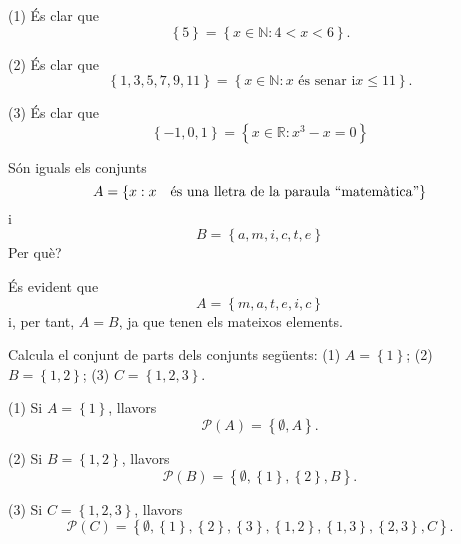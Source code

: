 \begin{solucio}
(1) \'{E}s clar que%
\begin{equation*}
\left\{ 5\right\} =\left\{ x\in \mathbb{N}:4<x<6\right\} \text{.}
\end{equation*}

(2) \'{E}s clar que%
\begin{equation*}
\left\{ 1,3,5,7,9,11\right\} =\left\{ x\in \mathbb{N}:x\text{ \'{e}s senar i
}x\leq 11\right\} \text{.}
\end{equation*}

(3) \'{E}s clar que%
\begin{equation*}
\left\{ -1,0,1\right\} =\left\{ x\in \mathbb{R}:x^{3}-x=0\right\}
\end{equation*}
\end{solucio}

\begin{exercici}
S\'{o}n iguals els conjunts%
\begin{equation*}
A=\left\{ x:x\text{ \'{e}s una lletra de la paraula \textquotedblleft matem%
\`{a}tica\textquotedblright }\right\}
\end{equation*}%
i%
\begin{equation*}
B=\left\{ a,m,i,c,t,e\right\}
\end{equation*}%
Per qu\`{e}?
\end{exercici}

\begin{solucio}
\'{E}s evident que%
\begin{equation*}
A=\left\{ m,a,t,e,i,c\right\}
\end{equation*}%
i, per tant, $A=B$, ja que tenen els mateixos elements.
\end{solucio}

\begin{exercici}
Calcula el conjunt de parts dels conjunts seg\"{u}ents: (1) $A=\left\{
1\right\} $; (2) $B=\left\{ 1,2\right\} $; (3) $C=\left\{ 1,2,3\right\} $.
\end{exercici}

\begin{solucio}
(1) Si $A=\left\{ 1\right\} $, llavors%
\begin{equation*}
\mathcal{P}(A)=\left\{ \emptyset ,A\right\} \text{.}
\end{equation*}

(2) Si $B=\left\{ 1,2\right\} $, llavors%
\begin{equation*}
\mathcal{P}(B)=\left\{ \emptyset ,\left\{ 1\right\} ,\left\{ 2\right\}
,B\right\} \text{.}
\end{equation*}

(3) Si $C=\left\{ 1,2,3\right\} $, llavors%
\begin{equation*}
\mathcal{P}(C)=\left\{ \emptyset ,\left\{ 1\right\} ,\left\{ 2\right\}
,\left\{ 3\right\} ,\left\{ 1,2\right\} ,\left\{ 1,3\right\} ,\left\{
2,3\right\} ,C\right\} \text{.}
\end{equation*}
\end{solucio}

